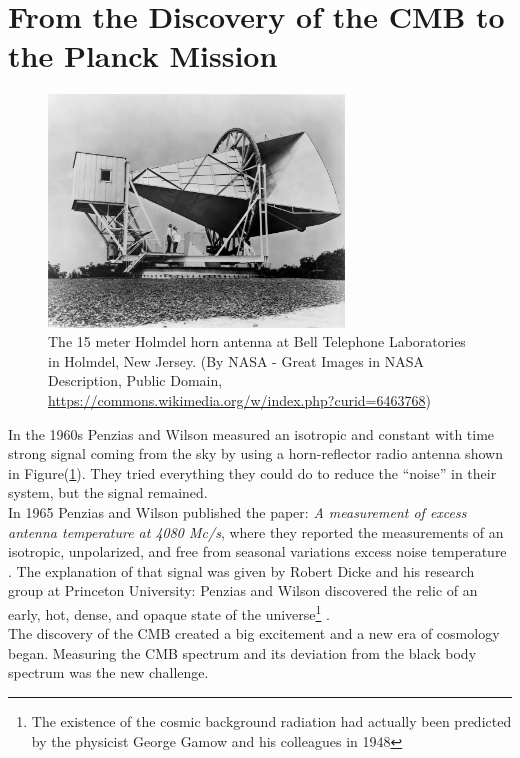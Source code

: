 \documentclass{article}
\begin{document}
\section{From the Discovery of the CMB to the Planck Mission}
%
%
%
\begin{figure}
\begin{center}
\includegraphics[width=0.7\textwidth]{Horn_Antenna.jpeg}
\caption{The 15 meter Holmdel horn antenna at Bell Telephone Laboratories in Holmdel, New Jersey.
(By NASA - Great Images in NASA Description, Public Domain, \url{https://commons.wikimedia.org/w/index.php?curid=6463768})}
\label{antenna}
\end{center}
\end{figure}
%
%
%
In the 1960s Penzias and Wilson measured an isotropic and constant with time strong signal coming from the sky by using a horn-reflector radio antenna shown in Figure(\ref{antenna}). 
They tried everything they could do to reduce the “noise” in their system, but the signal remained.\\
In 1965 Penzias and Wilson published the paper: \emph{A measurement of excess antenna temperature at
4080 Mc/s}, where they reported the measurements of an isotropic, unpolarized, and free from seasonal variations excess noise temperature
\citep{penziasMeasurementExcessAntenna1965}.
The explanation of that signal was given by Robert Dicke and his research group at Princeton University: Penzias and Wilson discovered the relic of an early, hot, dense, and opaque state of the universe\footnote{The existence of the cosmic background radiation had actually been predicted by the physicist George Gamow and his colleagues in 1948} \citep{bucherPhysicsCosmicMicrowave2015}
. \\
The discovery of the CMB created a big excitement and a new era of cosmology began.
Measuring the CMB spectrum and its deviation from the black body spectrum was the new challenge.
\end{document}
